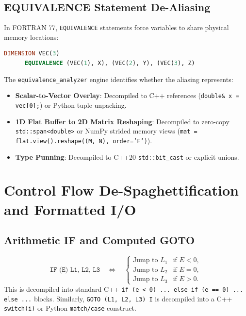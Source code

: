 \documentclass[11pt,a4paper]{article}
\theoremstyle{definition}
\begin{document}
\subsection{EQUIVALENCE Statement De-Aliasing}
In FORTRAN 77, \texttt{EQUIVALENCE} statements force variables to share physical memory locations:
\begin{lstlisting}[language=Fortran]
      DIMENSION VEC(3)
      EQUIVALENCE (VEC(1), X), (VEC(2), Y), (VEC(3), Z)
\end{lstlisting}
The \texttt{equivalence\_analyzer} engine identifies whether the aliasing represents:
\begin{itemize}
    \item \textbf{Scalar-to-Vector Overlay}: Decompiled to C++ references (\texttt{double\& x = vec[0];}) or Python tuple unpacking.
    \item \textbf{1D Flat Buffer to 2D Matrix Reshaping}: Decompiled to zero-copy \texttt{std::span<double>} or NumPy strided memory views (\texttt{mat = flat.view().reshape((M, N), order='F')}).
    \item \textbf{Type Punning}: Decompiled to C++20 \texttt{std::bit\_cast} or explicit unions.
\end{itemize}

\section{Control Flow De-Spaghettification and Formatted I/O}

\subsection{Arithmetic IF and Computed GOTO}
\begin{equation}
    \texttt{IF (E) L1, L2, L3} \quad \Longleftrightarrow \quad \begin{cases}
        \text{Jump to } L_1 & \text{if } E < 0, \\
        \text{Jump to } L_2 & \text{if } E = 0, \\
        \text{Jump to } L_3 & \text{if } E > 0.
    \end{cases}
\end{equation}
This is decompiled into standard C++ \texttt{if (e < 0) ... else if (e == 0) ... else ...} blocks. Similarly, \texttt{GOTO (L1, L2, L3) I} is decompiled into a C++ \texttt{switch(i)} or Python \texttt{match/case} construct.
\end{document}
